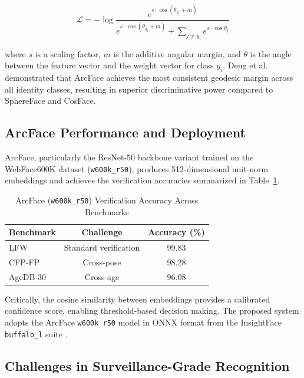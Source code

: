 \documentclass[12pt, a4paper]{article}
\begin{document}
\begin{equation}
    \mathcal{L} = -\log \frac{e^{s \cdot \cos(\theta_{y_i} + m)}}{e^{s \cdot \cos(\theta_{y_i} + m)} + \displaystyle\sum_{j \neq y_i} e^{s \cdot \cos \theta_j}}
    \label{eq:arcface}
\end{equation}

\noindent where $s$ is a scaling factor, $m$ is the additive angular margin, and $\theta$ is the angle between the feature vector and the weight vector for class $y_i$. Deng et al.\ \cite{deng2019arcface} demonstrated that ArcFace achieves the most consistent geodesic margin across all identity classes, resulting in superior discriminative power compared to SphereFace and CosFace.

\subsection{ArcFace Performance and Deployment}

ArcFace, particularly the ResNet-50 backbone variant trained on the WebFace600K dataset (\texttt{w600k\_r50}), produces 512-dimensional unit-norm embeddings and achieves the verification accuracies summarized in Table~\ref{tab:arcface_benchmarks}.

\begin{table}[H]
    \centering
    \caption{ArcFace (\texttt{w600k\_r50}) Verification Accuracy Across Benchmarks}
    \label{tab:arcface_benchmarks}
    \begin{tabular}{lcc}
        \toprule
        \textbf{Benchmark} & \textbf{Challenge} & \textbf{Accuracy (\%)} \\
        \midrule
        LFW & Standard verification & 99.83 \\
        CFP-FP & Cross-pose & 98.28 \\
        AgeDB-30 & Cross-age & 96.08 \\
        \bottomrule
    \end{tabular}
\end{table}

\noindent Critically, the cosine similarity between embeddings provides a calibrated confidence score, enabling threshold-based decision making. The proposed system adopts the ArcFace \texttt{w600k\_r50} model in ONNX format from the InsightFace \texttt{buffalo\_l} suite \cite{deng2022subcenter}.

\subsection{Challenges in Surveillance-Grade Recognition}
\end{document}
